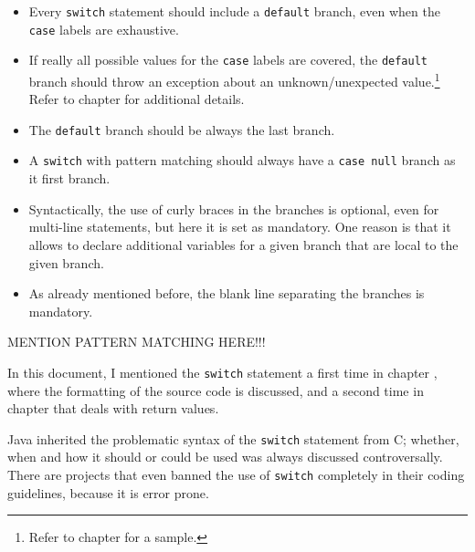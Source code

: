 \begin{itemize}
\item{Every \lstinline|switch| statement should include a \lstinline|default| branch, even when the \lstinline|case| labels are exhaustive.}

\item{If really all possible values for the \lstinline|case| labels are covered, the \lstinline|default| branch should throw an exception about an unknown/unexpected value.\footnote{Refer to chapter \autocite{TQUADRAT_ORG_FOUNDATION_UNSUPPORTEDENUMERROR} for a sample.}  Refer to chapter  for additional details.}

\item{The \lstinline|default| branch should be always the last branch.}

\item{A \lstinline|switch| with pattern matching should always have a \lstinline|case null| branch as it first branch.}

\item{Syntactically, the use of curly braces in the branches is optional, even for multi-line statements, but here it is set as mandatory. One reason is that it allows to declare additional variables for a given branch that are local to the given branch.}

\item{As already mentioned before, the blank line separating the branches is mandatory.}
\end{itemize}


MENTION PATTERN MATCHING HERE!!!

In this document, I mentioned the \lstinline|switch| statement\autocite{ORACLE_DOC_LANGUAGE_SPECIFICATION:Switch} a first time in chapter , where the formatting of the source code is discussed, and a second time in chapter  that deals with return values.

Java inherited the problematic syntax of the \lstinline|switch| statement from C; whether, when and how it should or could be used was always discussed controversally. There are projects that even banned the use of \lstinline|switch| completely in their coding guidelines, because it is error prone.

